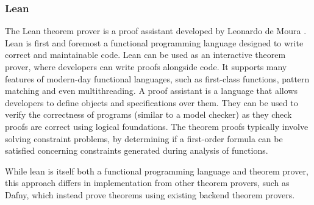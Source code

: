\subsubsection{Lean}
The Lean theorem prover is a proof assistant developed by Leonardo de Moura \cite{lean}. Lean is first and foremost a functional programming language designed to write correct and maintainable code. Lean can be used as an interactive theorem prover, where developers can write proofs alongside code. It supports many features of modern-day functional languages, such as first-class functions, pattern matching and even multithreading. A proof assistant is a language that allows developers to define objects and specifications over them. They can be used to verify the correctness of programs (similar to a model checker) as they check proofs are correct using logical foundations. The theorem proofs typically involve solving constraint problems, by determining if a first-order formula can be satisfied concerning constraints generated during analysis of functions.
\par
While lean is itself both a functional programming language and theorem prover, this approach differs in implementation from other theorem provers, such as Dafny, which instead prove theorems using existing backend theorem provers.

